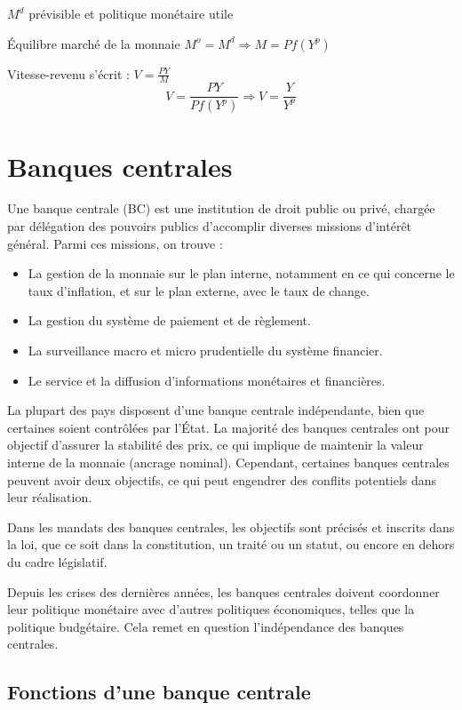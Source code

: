 \documentclass[a4paper, 12pt]{report}
\begin{document}
$M^d$ prévisible et politique monétaire utile

Équilibre marché de la monnaie $M^o = M^d \Rightarrow M = P f(Y^p)$

Vitesse-revenu s'écrit : \( V = \frac{PY}{M} \)
\[ V = \frac{PY}{Pf(Y^p)} \Rightarrow V = \frac{Y}{Y^p}\]

\chapter{Banques centrales}

Une banque centrale (BC) est une institution de droit public ou privé, chargée par délégation des pouvoirs publics d'accomplir diverses missions d'intérêt général. Parmi ces missions, on trouve :

\begin{itemize}
	\item La gestion de la monnaie sur le plan interne, notamment en ce qui concerne le taux d'inflation, et sur le plan externe, avec le taux de change.
	\item La gestion du système de paiement et de règlement.
	\item La surveillance macro et micro prudentielle du système financier.
	\item Le service et la diffusion d'informations monétaires et financières.
\end{itemize}

La plupart des pays disposent d'une banque centrale indépendante, bien que certaines soient contrôlées par l'État. La majorité des banques centrales ont pour objectif d'assurer la stabilité des prix, ce qui implique de maintenir la valeur interne de la monnaie (ancrage nominal). Cependant, certaines banques centrales peuvent avoir deux objectifs, ce qui peut engendrer des conflits potentiels dans leur réalisation.

Dans les mandats des banques centrales, les objectifs sont précisés et inscrits dans la loi, que ce soit dans la constitution, un traité ou un statut, ou encore en dehors du cadre législatif. 

Depuis les crises des dernières années, les banques centrales doivent coordonner leur politique monétaire avec d'autres politiques économiques, telles que la politique budgétaire. Cela remet en question l'indépendance des banques centrales.

\section{Fonctions d'une banque centrale}
\end{document}
